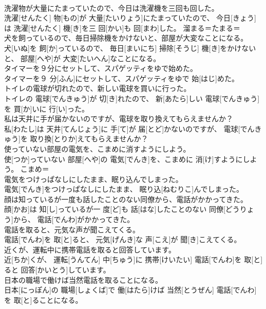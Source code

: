 \documentclass[8pt]{extreport}
\begin{document}
\begin{CJK}{UTF8}{min}
\\	洗濯物が大量にたまっていたので、今日は洗濯機を三回も回した。	
\\	洗濯[せんたく] 物[もの]が 大量[たいりょう]にたまっていたので、 今日[きょう]は 洗濯[せんたく] 機[き]を三 回[かい]も 回[まわ]した。	溜まる＝たまる＝ 
\\	犬を飼っているので、毎日掃除機をかけないと、部屋が大変なことになる。	
\\	犬[いぬ]を 飼[か]っているので、 毎日[まいにち] 掃除[そうじ] 機[き]をかけないと、 部屋[へや]が 大変[たいへん]なことになる。	
\\	タイマーを９分にセットして、スパゲッティをゆで始めた。	
\\	タイマーを９ 分[ふん]にセットして、スパゲッティをゆで 始[はじ]めた。	
\\	トイレの電球が切れたので、新しい電球を買いに行った。	
\\	トイレの 電球[でんきゅう]が 切[き]れたので、 新[あたら]しい 電球[でんきゅう]を 買[か]いに 行[い]った。	
\\	私は天井に手が届かないのですが、電球を取り換えてもらえませんか？	
\\	私[わたし]は 天井[てんじょう]に 手[て]が 届[とど]かないのですが、 電球[でんきゅう]を 取り換[とりか]えてもらえませんか？	
\\	使っていない部屋の電気を、こまめに消すようにしよう。	
\\	使[つか]っていない 部屋[へや]の 電気[でんき]を、こまめに 消[け]すようにしよう。	こまめ＝ 
\\	電気をつけっぱなしにしたまま、眠り込んでしまった。	
\\	電気[でんき]をつけっぱなしにしたまま、 眠り込[ねむりこ]んでしまった。	
\\	顔は知っているが一度も話したことのない同僚から、電話がかかってきた。	
\\	顔[かお]は 知[し]っているが一 度[ど]も 話[はな]したことのない 同僚[どうりょう]から、 電話[でんわ]がかかってきた。	
\\	電話を取ると、元気な声が聞こえてくる。	
\\	電話[でんわ]を 取[と]ると、 元気[げんき]な 声[こえ]が 聞[き]こえてくる。	
\\	近くが、運転中に携帯電話を取ると回答しています。	
\\	[ぱーせんと] 近[ちか]くが、 運転[うんてん] 中[ちゅう]に 携帯[けいたい] 電話[でんわ]を 取[と]ると 回答[かいとう]しています。	
\\	日本の職場で働けば当然電話を取ることになる。	
\\	日本[にっぽん]の 職場[しょくば]で 働[はたら]けば 当然[とうぜん] 電話[でんわ]を 取[と]ることになる。	

\end{CJK}
\end{document}

